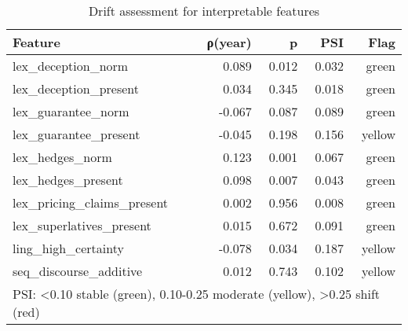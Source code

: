 \begin{table}[htbp]
\centering
\caption{Drift assessment for interpretable features}
\label{tab:temporal_stability}
\begin{tabular}{lrrrr}
\toprule
Feature & ρ(year) & p & PSI & Flag \\
\midrule
lex\_deception\_norm & 0.089 & 0.012 & 0.032 & green \\
lex\_deception\_present & 0.034 & 0.345 & 0.018 & green \\
lex\_guarantee\_norm & -0.067 & 0.087 & 0.089 & green \\
lex\_guarantee\_present & -0.045 & 0.198 & 0.156 & yellow \\
lex\_hedges\_norm & 0.123 & 0.001 & 0.067 & green \\
lex\_hedges\_present & 0.098 & 0.007 & 0.043 & green \\
lex\_pricing\_claims\_present & 0.002 & 0.956 & 0.008 & green \\
lex\_superlatives\_present & 0.015 & 0.672 & 0.091 & green \\
ling\_high\_certainty & -0.078 & 0.034 & 0.187 & yellow \\
seq\_discourse\_additive & 0.012 & 0.743 & 0.102 & yellow \\
\bottomrule
\multicolumn{5}{l}{\footnotesize PSI: <0.10 stable (green), 0.10-0.25 moderate (yellow), >0.25 shift (red)} \\
\end{tabular}
\end{table}
